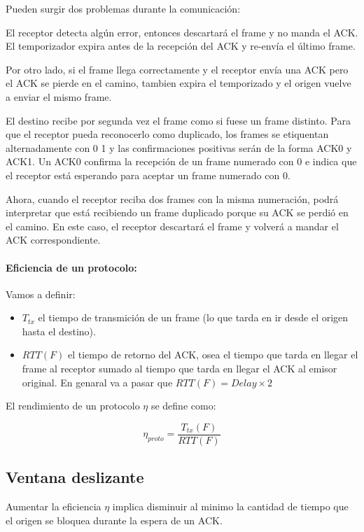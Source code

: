 Pueden surgir dos problemas durante la comunicación:
  
El receptor detecta algún error, entonces descartará el frame y no manda el ACK. El temporizador expira antes de la recepción del ACK y re-envía el último frame.

Por otro lado, si el frame llega correctamente y el receptor envía una ACK pero el ACK se pierde en el camino, tambien expira el temporizado y el origen vuelve a enviar el mismo frame. 
  
El destino recibe por segunda vez el frame como si fuese un frame distinto. Para que el receptor pueda reconocerlo como duplicado, los frames se etiquentan alternadamente con 0  1 y las confirmaciones positivas serán de la forma ACK0 y ACK1. Un ACK0 confirma la recepción de un frame numerado con 0 e indica que el receptor está esperando para aceptar un frame numerado con 0.

Ahora, cuando el receptor reciba dos frames con la misma numeración, podrá interpretar que está recibiendo un frame duplicado porque su ACK se perdió en el camino. En este caso, el receptor descartará el frame y volverá a mandar el ACK correspondiente.

\paragraph{Eficiencia de un protocolo:} 
Vamos a definir:
\begin{itemize}
  \item \(T_{tx}\) el tiempo de transmición de un frame (lo que tarda en ir desde el origen hasta el destino).
  \item \(RTT(F)\) el tiempo de retorno del ACK, osea el tiempo que tarda en llegar el frame al receptor sumado al tiempo que tarda en llegar el ACK al emisor original. En genaral va a pasar que \(RTT(F) = Delay\times 2\) 
\end{itemize}

El rendimiento de un protocolo \(\eta\) se define como:

\[\eta_{proto} = \frac{T_{tx}(F)}{RTT(F)}\]

\subsection{Ventana deslizante}\label{sec:ventana-deslizante}
Aumentar la eficiencia \(\eta\) implica disminuir al minimo la cantidad de tiempo que el origen se bloquea durante la espera de un ACK.


